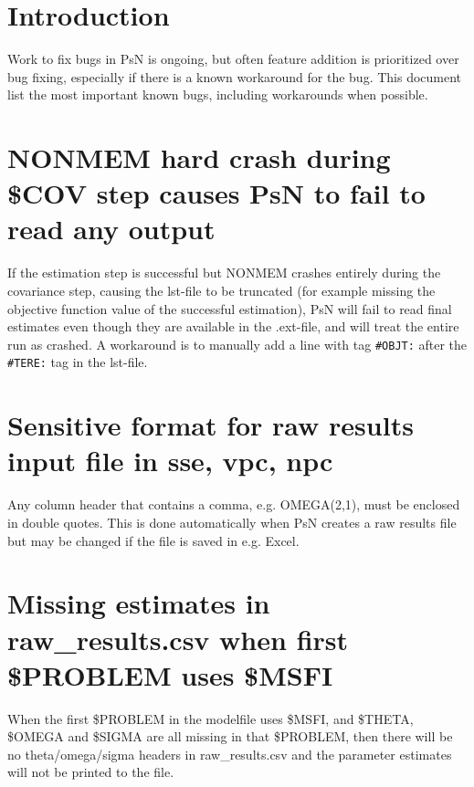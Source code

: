 



\maketitle


\section{Introduction}
Work to fix bugs in PsN is ongoing, but often feature addition is prioritized over bug fixing, especially if there is a known workaround for the bug. This document list the most important known bugs, including workarounds when possible.   

\section{NONMEM hard crash during \$COV step causes PsN to fail to read any output}
If the estimation step is successful but NONMEM crashes entirely during the covariance step, causing the
lst-file to be truncated (for example missing the objective function value of the successful estimation),
PsN will fail to read final estimates even though they are available in the .ext-file, 
and will treat the entire run as crashed. A workaround is to manually add a line with tag \verb|#OBJT:| after the 
\verb|#TERE:| tag in the lst-file.

\section{Sensitive format for raw results input file in sse, vpc, npc}
Any column header that contains a comma, e.g. OMEGA(2,1), must be enclosed in double quotes. This is done automatically when PsN creates a raw results file but may be changed if the file is saved in e.g. Excel.

\section{Missing estimates in raw\_results.csv when first \$PROBLEM uses \$MSFI}
When the first \$PROBLEM in the modelfile uses \$MSFI, and \$THETA, \$OMEGA and \$SIGMA are all missing in that \$PROBLEM, then there will be no theta/omega/sigma headers in raw\_results.csv and the parameter estimates will not be printed to the file.

